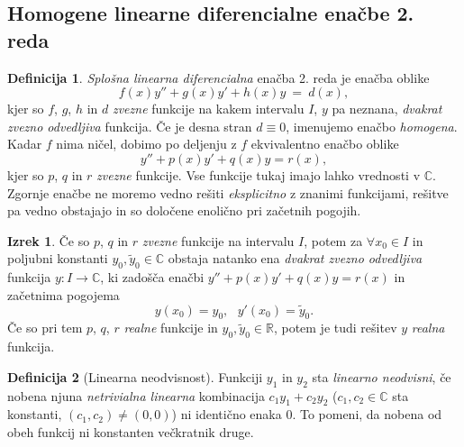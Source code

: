 \documentclass[11pt]{article}
\theoremstyle{definition}
\newtheorem{definicija}{Definicija}[section]
\theoremstyle{definition}
\theoremstyle{definition}
\newtheorem{izrek}{Izrek}[section]
\begin{document}

\subsection{Homogene linearne diferencialne enačbe 2. reda}
\vspace{0.5cm}

\begin{definicija}

\textit{Splošna linearna diferencialna} enačba 2. reda je enačba oblike
$$f(x) y'' + g(x) y' + h(x) y ~=~ d(x),$$
kjer so $f$, $g$, $h$ in $d$ \textit{zvezne} funkcije na kakem intervalu $I$, $y$ pa neznana, \textit{dvakrat zvezno odvedljiva} funkcija. Če je desna stran $d \equiv 0$, imenujemo enačbo \textit{homogena}. Kadar $f$ nima ničel, dobimo po deljenju z $f$ ekvivalentno enačbo oblike
$$y'' + p(x) y' + q(x) y = r(x),$$
kjer so $p$, $q$ in $r$ \textit{zvezne} funkcije. Vse funkcije tukaj imajo lahko vrednosti v $\mathbb{C}$. Zgornje enačbe ne moremo vedno rešiti \textit{eksplicitno} z znanimi funkcijami, rešitve pa vedno obstajajo in so določene enolično pri začetnih pogojih.

\end{definicija}
\vspace{0.5cm}

\begin{izrek}

Če so $p$, $q$ in $r$ \textit{zvezne} funkcije na intervalu $I$, potem za $\forall x_0 \in I$ in poljubni konstanti $y_0, \tilde{y}_0 \in \mathbb{C}$ obstaja natanko ena \textit{dvakrat zvezno odvedljiva} funkcija $y: I \rightarrow \mathbb{C}$, ki zadošča enačbi $y'' + p(x) y' + q(x) y = r(x)$ in začetnima pogojema 
$$y(x_0) = y_0, ~~~y'(x_0) = \tilde{y}_0.$$
Če so pri tem $p$, $q$, $r$ \textit{realne} funkcije in $y_0, \tilde{y}_0 \in \mathbb{R}$, potem je tudi rešitev $y$ \textit{realna} funkcija.

\end{izrek}
\vspace{0.5cm}

\begin{definicija}[Linearna neodvisnost]

Funkciji $y_1$ in $y_2$ sta \textit{linearno neodvisni}, če nobena njuna \textit{netrivialna linearna} kombinacija $c_1 y_1 + c_2 y_2$ ($c_1, c_2 \in \mathbb{C}$ sta konstanti, $(c_1, c_2) \neq (0,0)$) ni identično enaka $0$. To pomeni, da nobena od obeh funkcij ni konstanten večkratnik druge.

\end{definicija}
\vspace{0.5cm}
\end{document}
